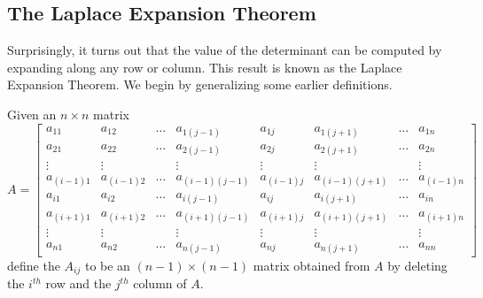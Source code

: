 \documentclass{ximera}
\begin{document}
\subsection*{The Laplace Expansion Theorem}
Surprisingly, it turns out that the value of the determinant can be computed by expanding along any row or column.  This result is known as the Laplace Expansion Theorem.  We begin by generalizing some earlier definitions.

Given an $n\times n$ matrix 
$$A=\begin{bmatrix}a_{11} & a_{12} & \dots & a_{1(j-1)} & a_{1j} & a_{1(j+1)} & \dots & a_{1n}  \\
    a_{21} & a_{22} & \dots & a_{2(j-1)} & a_{2j} & a_{2(j+1)} & \dots & a_{2n}  \\
   \vdots & \vdots &  & \vdots & \vdots & \vdots &  & \vdots  \\
   a_{(i-1)1} & a_{(i-1)2} & \ldots & a_{(i-1)(j-1)} & a_{(i-1)j} & a_{(i-1)(j+1)} & \ldots & a_{(i-1)n}\\
  a_{i1} & a_{i2} & \ldots & a_{i(j-1)} & a_{ij} & a_{i(j+1)} & \ldots & a_{in}\\
  a_{(i+1)1} & a_{(i+1)2} & \ldots & a_{(i+1)(j-1)} & a_{(i+1)j} & a_{(i+1)(j+1)} & \ldots & a_{(i+1)n}\\
  \vdots & \vdots &  & \vdots & \vdots & \vdots &  & \vdots  \\
   a_{n1} & a_{n2} & \dots & a_{n(j-1)} & a_{nj} & a_{n(j+1)} & \dots & a_{nn}\end{bmatrix}$$
   define the  $A_{ij}$ to be an $(n-1)\times (n-1)$ matrix obtained from $A$ by deleting the $i^{th}$ row and the $j^{th}$ column of $A$.
\begin{center}
 \end{center} 
 
\end{document}
